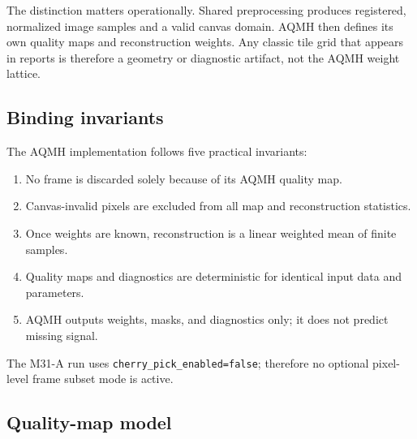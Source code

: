 \documentclass[10pt,twocolumn]{article}
\begin{document}
The distinction matters operationally. Shared preprocessing produces registered, normalized image
samples and a valid canvas domain. AQMH then defines its own quality maps and reconstruction
weights. Any classic tile grid that appears in reports is therefore a geometry or diagnostic
artifact, not the AQMH weight lattice.

\subsection{Binding invariants}

The AQMH implementation follows five practical invariants:
\begin{enumerate}
  \item No frame is discarded solely because of its AQMH quality map.
  \item Canvas-invalid pixels are excluded from all map and reconstruction statistics.
  \item Once weights are known, reconstruction is a linear weighted mean of finite samples.
  \item Quality maps and diagnostics are deterministic for identical input data and parameters.
  \item AQMH outputs weights, masks, and diagnostics only; it does not predict missing signal.
\end{enumerate}
The M31-A run uses \texttt{cherry\_pick\_enabled=false}; therefore no optional pixel-level
frame subset mode is active.

\subsection{Quality-map model}
\end{document}
